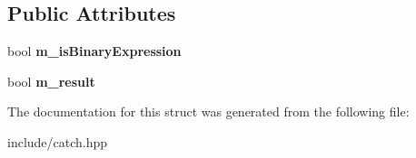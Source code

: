 \subsection*{Public Attributes}
\begin{DoxyCompactItemize}
\item 
bool {\bfseries m\+\_\+is\+Binary\+Expression}\hypertarget{structCatch_1_1ITransientExpression_a75ce48da824d514d08152d396abb28d8}{}\label{structCatch_1_1ITransientExpression_a75ce48da824d514d08152d396abb28d8}

\item 
bool {\bfseries m\+\_\+result}\hypertarget{structCatch_1_1ITransientExpression_a4646e2b5e0156e913653ec3b9b60c942}{}\label{structCatch_1_1ITransientExpression_a4646e2b5e0156e913653ec3b9b60c942}

\end{DoxyCompactItemize}


The documentation for this struct was generated from the following file\+:\begin{DoxyCompactItemize}
\item 
include/catch.\+hpp\end{DoxyCompactItemize}
